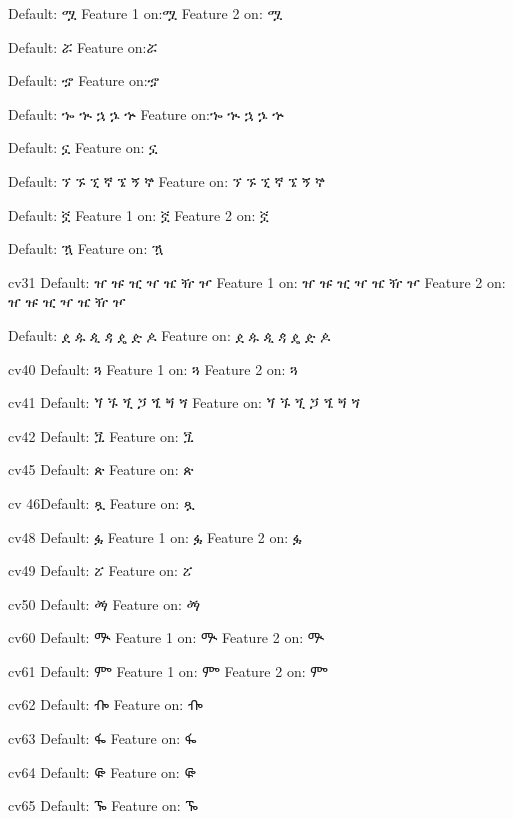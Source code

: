 \IndSS Default: ሟ
\IndSS\fourone Feature 1 on:ሟ
\IndSS\fourtwo Feature 2 on: ሟ

\IndSS Default: ሯ
\IndSS\five Feature on:ሯ

\IndSS Default: ኇ
\IndSS\seventeen Feature on:ኇ

\IndSS Default: ኈ ኊ ኋ ኌ ኍ
\IndSS\eighteen Feature on:ኈ ኊ ኋ ኌ ኍ

\IndSS Default: ኗ
\IndSS\nineteen Feature on: ኗ

\IndSS Default: ኘ ኙ ኚ ኛ ኜ ኝ ኞ
\IndSS\twenty Feature on: ኘ ኙ ኚ ኛ ኜ ኝ ኞ

\IndSS Default: ኟ
\IndSS\twentyoneone Feature 1 on: ኟ
\IndSS\twentyonetwo Feature 2 on: ኟ

\IndSS Default: ዃ
\IndSS\twentysix Feature on: ዃ

\IndSS cv31 Default: ዠ ዡ ዢ ዣ ዤ ዥ ዦ
\IndSS\thirtyoneone Feature 1 on: ዠ ዡ ዢ ዣ ዤ ዥ ዦ
\IndSS\thirtyonetwo Feature 2 on: ዠ ዡ ዢ ዣ ዤ ዥ ዦ

\IndSS Default: ዸ ዹ ዺ ዻ ዼ ዽ ዾ
\IndSS\thirtytwo Feature on: ዸ ዹ ዺ ዻ ዼ ዽ ዾ

\IndSS cv40 Default: ጓ
\IndSS\fortyone Feature 1 on: ጓ
\IndSS\fortytwo Feature 2 on: ጓ

\IndSS cv41 Default: ጘ ጙ ጚ ጛ ጜ ጝ ጞ
\IndSS\fortyoneone Feature on: ጘ ጙ ጚ ጛ ጜ ጝ ጞ

\IndSS cv42 Default: ጟ
\IndSS\fortytwoone Feature on: ጟ

\IndSS cv45 Default: ጵ
\IndSS\fortyfive Feature on: ጵ

\IndSS cv 46Default: ጿ
\IndSS\fortysix Feature on: ጿ

\IndSS cv48 Default: ፏ
\IndSS\fortyeightone Feature 1 on: ፏ
\IndSS\fortyeighttwo Feature 2 on: ፏ

\IndSS cv49 Default: ፘ
\IndSS\fortynine Feature on: ፘ

\IndSS cv50 Default: ፙ
\IndSS\fifty Feature on: ፙ

\IndSS cv60 Default: ᎁ
\IndSS\sixtyone Feature 1 on: ᎁ
\IndSS\sixtytwo Feature 2 on: ᎁ

\IndSS cv61 Default: ᎃ
\IndSS\sixtyoneone Feature 1 on: ᎃ
\IndSS\sixtyonetwo Feature 2 on: ᎃ

\IndSS cv62 Default: ᎇ
\IndSS\sixtytwoone Feature on: ᎇ

\IndSS cv63 Default: ᎊ
\IndSS\sixtythree Feature on: ᎊ

\IndSS cv64 Default: ᎋ
\IndSS\sixtyfour Feature on: ᎋ

\IndSS cv65 Default: ᎏ
\IndSS\sixtyfive Feature on: ᎏ


